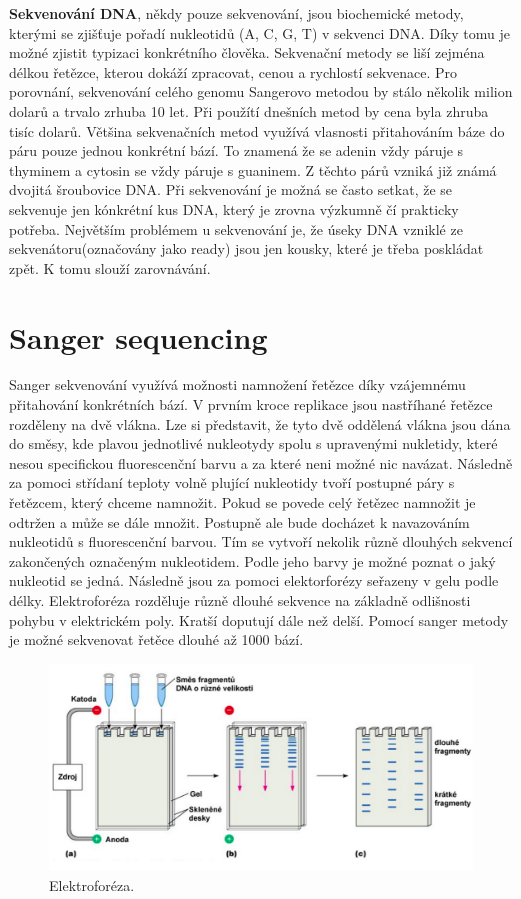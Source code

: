 \documentclass[czech,DP]{thesiskiv}
\numberwithin{equation}{section}
\begin{document}
\noindent
\textbf{Sekvenování DNA}, někdy pouze sekvenování, jsou biochemické metody, kterými se zjišťuje pořadí nukleotidů (A, C, G, T) v sekvenci DNA. Díky tomu je možné zjistit typizaci konkrétního člověka. Sekvenační metody se liší zejména délkou řetězce, kterou dokáží zpracovat, cenou a rychlostí sekvenace. Pro porovnání, sekvenování celého genomu Sangerovo metodou by stálo několik milion dolarů a trvalo zrhuba 10 let. Při použítí dnešních metod by cena byla zhruba tisíc dolarů. Většina sekvenačních metod využívá vlasnosti přitahováním báze do páru pouze jednou konkrétní bází. To znamená že se adenin vždy páruje s thyminem a cytosin se vždy páruje s guaninem. Z těchto párů vzniká již známá dvojitá šroubovice DNA. Při sekvenování je možná se často setkat, že se sekvenuje jen kónkrétní kus DNA, který je zrovna výzkumně čí prakticky potřeba. Největším problémem u sekvenování je, že úseky DNA vzniklé ze sekvenátoru(označovány jako ready) jsou jen kousky, které je třeba poskládat zpět. K tomu slouží zarovnávání. \cite{sekvenovani_ziva} 


\section{Sanger sequencing}
Sanger sekvenování využívá možnosti namnožení řetězce díky vzájemnému přitahování konkrétních bází. V prvním kroce replikace jsou nastříhané řetězce rozděleny na dvě vlákna. Lze si představit, že tyto dvě oddělená vlákna jsou dána do směsy, kde plavou jednotlivé nukleotydy spolu s upravenými nukletidy, které nesou specifickou fluorescenční barvu a za které neni možné nic navázat. Následně za pomoci střídaní teploty volně plující nukleotidy tvoří postupné páry s řetězcem, který chceme namnožit. Pokud se povede celý řetězec namnožit je odtržen a může se dále množit. Postupně ale bude docházet k navazováním nukleotidů s fluorescenční barvou. Tím se vytvoří nekolik různě dlouhých sekvencí zakončených označeným nukleotidem. Podle jeho barvy je možné poznat o jaký nukleotid se jedná. Následně jsou za pomoci elektorforézy seřazeny v gelu podle délky. Elektroforéza rozděluje různě dlouhé sekvence na základně odlišnosti pohybu v elektrickém poly. Kratší doputují dále než delší. Pomocí sanger metody je možné sekvenovat řetěce dlouhé až 1000 bází.   

\begin{figure}[H]		
		\centering
		\includegraphics[width=\textwidth]{./img/elektroforeza.png}
		\caption{Elektroforéza. \cite{elektroforeza_img}}
		\label{fig:elektroforeza}
\end{figure}
 
\end{document}
